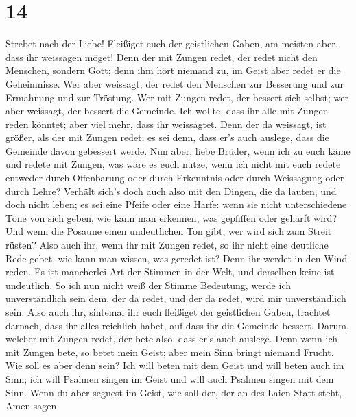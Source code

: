 \hypertarget{section-13}{%
\section{14}\label{section-13}}

 Strebet nach der Liebe! Fleißiget euch der geistlichen
Gaben, am meisten aber, dass ihr weissagen möget!  Denn
der mit Zungen redet, der redet nicht den Menschen, sondern Gott; denn
ihm hört niemand zu, im Geist aber redet er die Geheimnisse.
 Wer aber weissagt, der redet den Menschen zur Besserung
und zur Ermahnung und zur Tröstung.  Wer mit Zungen redet,
der bessert sich selbst; wer aber weissagt, der bessert die Gemeinde.
 Ich wollte, dass ihr alle mit Zungen reden könntet; aber
viel mehr, dass ihr weissagtet. Denn der da weissagt, ist größer, als
der mit Zungen redet; es sei denn, dass er's auch auslege, dass die
Gemeinde davon gebessert werde.  Nun aber, liebe Brüder,
wenn ich zu euch käme und redete mit Zungen, was wäre es euch nütze,
wenn ich nicht mit euch redete entweder durch Offenbarung oder durch
Erkenntnis oder durch Weissagung oder durch Lehre? 
Verhält sich's doch auch also mit den Dingen, die da lauten, und doch
nicht leben; es sei eine Pfeife oder eine Harfe: wenn sie nicht
unterschiedene Töne von sich geben, wie kann man erkennen, was gepfiffen
oder geharft wird?  Und wenn die Posaune einen
undeutlichen Ton gibt, wer wird sich zum Streit rüsten? 
Also auch ihr, wenn ihr mit Zungen redet, so ihr nicht eine deutliche
Rede gebet, wie kann man wissen, was geredet ist? Denn ihr werdet in den
Wind reden.  Es ist mancherlei Art der Stimmen in der
Welt, und derselben keine ist undeutlich.  So ich nun
nicht weiß der Stimme Bedeutung, werde ich unverständlich sein dem, der
da redet, und der da redet, wird mir unverständlich sein.
 Also auch ihr, sintemal ihr euch fleißiget der
geistlichen Gaben, trachtet darnach, dass ihr alles reichlich habet, auf
dass ihr die Gemeinde bessert.  Darum, welcher mit Zungen
redet, der bete also, dass er's auch auslege.  Denn wenn
ich mit Zungen bete, so betet mein Geist; aber mein Sinn bringt niemand
Frucht.  Wie soll es aber denn sein? Ich will beten mit
dem Geist und will beten auch im Sinn; ich will Psalmen singen im Geist
und will auch Psalmen singen mit dem Sinn.  Wenn du aber
segnest im Geist, wie soll der, der an des Laien Statt steht, Amen sagen
